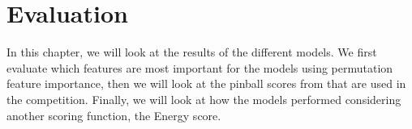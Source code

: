 \chapter{Evaluation}
\label{ch:Evaluation}

In this chapter, we will look at the results of the different models. 
We first evaluate which features are most important for the models using 
permutation feature importance, then we will look at the pinball scores from 
that are used in the competition. Finally, we will look at how the models performed 
considering another scoring function, the Energy score.



